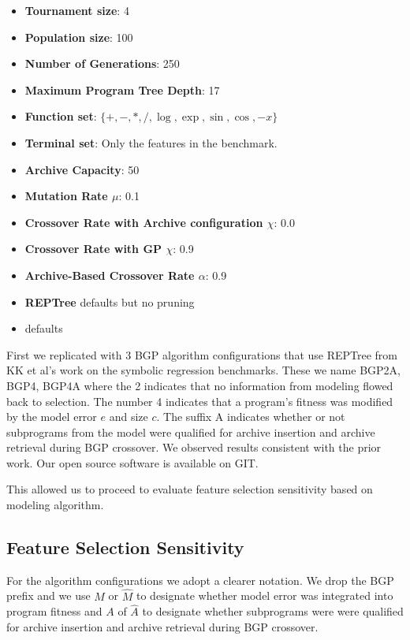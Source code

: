 \begin{itemize}
\item \textbf{Tournament size}: 4
\item \textbf{Population size}: 100
\item \textbf{Number of Generations}: 250
\item \textbf{Maximum Program Tree Depth}: 17
\item \textbf{Function set}: $\{ +, -, *, /, \log, \exp, \sin, \cos, -x \}$
\item \textbf{Terminal set}: Only the features in the benchmark.
\item \textbf{Archive Capacity}: 50
\item \textbf{Mutation Rate $\mu$}: 0.1
\item \textbf{Crossover Rate with Archive configuration $\chi$}: 0.0
\item \textbf{Crossover Rate with GP $\chi$}: 0.9
\item \textbf{Archive-Based Crossover Rate $\alpha$}: 0.9
\item \textbf{REPTree}  defaults but no pruning
\item \textbf{\SCIKIT} defaults
\end{itemize}

First we replicated with 3 BGP algorithm configurations that use REPTree from KK et al's work on the symbolic regression benchmarks. These we name BGP2A, BGP4, BGP4A where the 2 indicates that no information from modeling flowed back to selection. The number 4 indicates that a program's fitness was modified by the model error $e$ and size $c$.   The suffix A indicates whether or not subprograms from the model were qualified for archive insertion and archive retrieval during BGP crossover. We observed results consistent with the prior work. Our open source software is available on GIT.

This allowed us to proceed to evaluate feature selection sensitivity based on modeling algorithm.

\subsection{Feature Selection Sensitivity}\label{sect:ftr-select}

For the algorithm configurations we adopt a clearer notation. We drop the BGP prefix and we use $M$ or $\hat M$ to designate whether model error was integrated into program fitness and $A$ of $\hat A$ to designate whether subprograms were were qualified for archive insertion and archive retrieval during BGP crossover.

